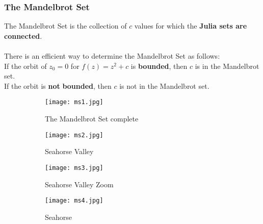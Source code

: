 \subsubsection{The Mandelbrot Set}
The Mandelbrot Set is the collection of $c$ values for which the \textbf{Julia sets are connected}.\\\\
There is an efficient way to determine the Mandelbrot Set as follows:\\
If the orbit of $z_0=0$ for $f(z)=z^2+c$ is \textbf{bounded}, then $c$ is in the Mandelbrot set.\\
If the orbit is \textbf{not} \textbf{bounded}, then $c$ is not in the Mandelbrot set.
\begin{figure}[h!]
	\centering
	\begin{subfigure}{0.45\linewidth}
		\centering
		\texttt{[image: ms1.jpg]}
		\caption{The Mandelbrot Set complete}
		\label{fig:ms1}
	\end{subfigure}
	\begin{subfigure}{0.45\linewidth}
		\centering
		\texttt{[image: ms2.jpg]}
		\caption{Seahorse Valley}
		\label{fig:ms2}
	\end{subfigure}
	\begin{subfigure}{0.45\linewidth}
		\centering
		\texttt{[image: ms3.jpg]}
		\caption{Seahorse Valley Zoom}
		\label{fig:ms3}
	\end{subfigure}
	\begin{subfigure}{0.45\linewidth}
		\centering
		\texttt{[image: ms4.jpg]}
		\caption{Seahorse}
		\label{fig:ms4}
	\end{subfigure}
	\caption{}
	\label{fig:ms}
\end{figure}
